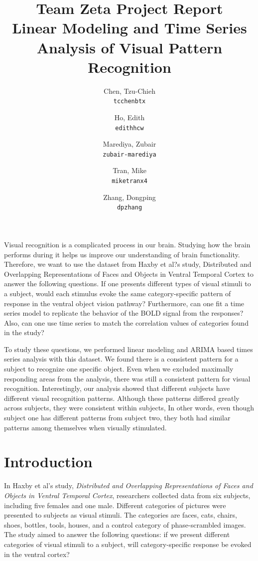 \documentclass[11pt,twocolumn]{article}
\title{\textbf{Team Zeta Project Report}\\
Linear Modeling and Time Series Analysis of Visual Pattern Recognition}\\
\author{
  Chen, Tzu-Chieh\\
  \texttt{tcchenbtx}
  \and
  Ho, Edith\\
  \texttt{edithhcw}
  \and
  Marediya, Zubair\\
  \texttt{zubair-marediya}
  \and
  Tran, Mike\\
  \texttt{miketranx4}
  \and
  Zhang, Dongping\\
  \texttt{dpzhang}
}
\begin{document}
\maketitle

\abstract{}
Visual recognition is a complicated process in our brain. Studying how the brain
 performs during it helps us improve our understanding of brain functionality. 
 Therefore, we want to use the dataset from Haxby et al?s study, Distributed and 
 Overlapping Representations of Faces and Objects in Ventral Temporal Cortex 
 to answer the following questions. If one presents different types of visual 
 stimuli to a subject, would each stimulus evoke the same category-specific 
 pattern of response in the ventral object vision pathway? Furthermore, can 
 one fit a time series model to replicate the behavior of the BOLD signal from 
 the responses? Also, can one use time series to match the correlation values 
 of categories found in the study? 

To study these questions, we performed linear modeling and ARIMA based 
times series analysis with this dataset. We found there is a consistent pattern 
for a subject to recognize one specific object. Even when we excluded maximally 
responding areas from the analysis, there was still a consistent pattern for visual 
recognition. Interestingly, our analysis showed that different subjects have 
different visual recognition patterns. Although these patterns differed greatly 
across subjects, they were consistent within subjects, In other words, even 
though subject one has different patterns from subject two, they both had 
similar patterns among themselves when visually stimulated.

\section{Introduction}

In Haxby et al's study, \emph{Distributed and Overlapping Representations of Faces
and Objects in Ventral Temporal Cortex}\cite{objectrec}, researchers collected data 
from six subjects, including five females and one male. 
Different categories of pictures were presented to subjects as visual stimuli.
The categories are faces, cats, chairs, shoes, bottles, tools, houses, 
and a control category of phase-scrambled images.
The study aimed to answer the following questions: if we present 
different categories of visual stimuli to a subject, will category-specific response be 
evoked in the ventral cortex? \\
\end{document}
